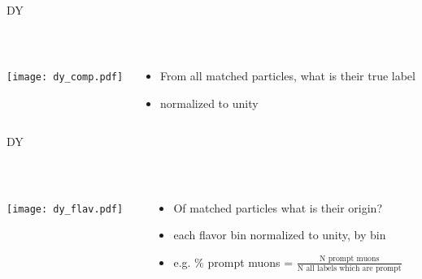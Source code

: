 \documentclass[10pt,handout]{beamer}
\begin{document}
\begin{frame}{ DY } 

\quad \quad \\
\begin{columns}
\begin{column}{0.5\textwidth}

\texttt{[image: dy\_comp.pdf]}
\end{column}
\begin{column}{0.5\textwidth}

\begin{itemize}
\item From all matched particles, what is their true label
\item normalized to unity
\end{itemize}

\end{column}
\end{columns}

\end{frame}


\begin{frame}{ DY } 

\quad \quad \\
\begin{columns}
\begin{column}{0.5\textwidth}

\texttt{[image: dy\_flav.pdf]}

\end{column}
\begin{column}{0.5\textwidth}
\begin{itemize}
\item Of matched particles what is their origin?
\item each flavor bin normalized to unity, by bin
\item e.g. $\%$ prompt muons = $\frac{\text{N prompt muons}}{ \text{N all labels which are prompt}}$
\end{itemize}
\end{column}
\end{columns}
\end{frame}
\end{document}
